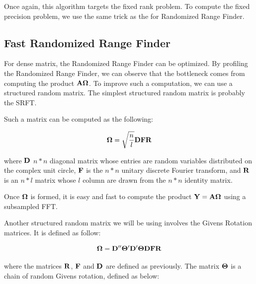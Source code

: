 \documentclass[onecolumn,12pt]{article}
\begin{document}
Once again, this algorithm targets the fixed rank problem. To compute the
fixed precision problem, we use the same trick as the for Randomized Range
Finder.

\subsection{Fast Randomized Range Finder}

For dense matrix, the Randomized Range Finder can be optimized. By profiling
the Randomized Range Finder, we can observe that the bottleneck comes from
computing the product $\bold{A} \bold{\Omega}$. To improve such a computation,
we can use a structured random matrix. The simplest structured random matrix
is probably the SRFT.

Such a matrix can be computed as the following:

\begin{equation}
\label{srft}
\bold{\Omega} = \sqrt{\frac{n}{l}}\bold{DFR}
\end{equation}

where $\bold{D}$ $n*n$ diagonal matrix whose entries are random variables
distributed on the complex unit circle, $\bold{F}$ is the $n*n$ unitary
discrete Fourier transform, and $\bold{R}$ is an $n*l$ matrix whose $l$ column
are drawn from the $n*n$ identity matrix.

Once $\bold{\Omega}$ is formed, it is easy and fast to compute the product
$\bold{Y} = \bold{A\Omega}$ using a subsampled FFT.

\noindent{}

Another structured random matrix we will be using involves the Givens Rotation
matrices. It is defined as follow:

\begin{equation}
\label{gsrft}
\bold{\Omega} = \bold{D}''\bold{\Theta}' \bold{D}' \bold{\Theta} \bold{D}
\bold{F} \bold{R}
\end{equation}

where the matrices $\bold{R}$, $\bold{F}$ and $\bold{D}$ are defined as previously.
The matrix $\bold{\Theta}$ is a chain of random Givens rotation, defined as
below:
\end{document}
